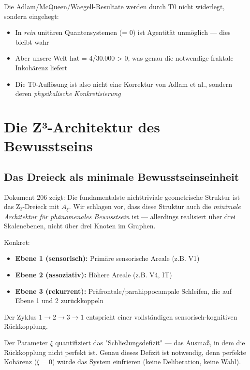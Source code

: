 \documentclass[11pt,a4paper]{article}
\begin{document}
	Die Adlam/McQueen/Waegell-Resultate werden durch T0 nicht widerlegt, sondern eingehegt:
	\begin{itemize}
		\item In \emph{rein} unitären Quantensystemen (\xi = 0) ist Agentität unmöglich — dies bleibt wahr
		\item Aber unsere Welt hat \xi = 4/30.000 > 0, was genau die notwendige fraktale Inkohärenz liefert
		\item Die T0-Auflösung ist also nicht eine Korrektur von Adlam et al., sondern deren \emph{physikalische Konkretisierung}
	\end{itemize}
	
	\section{Die Z³-Architektur des Bewusstseins}
	\label{sec:z3_architektur}
	
	\subsection{Das Dreieck als minimale Bewusstseinseinheit}
	
	Dokument 206 zeigt: Die fundamentalste nichttriviale geometrische Struktur ist das Z₃-Dreieck mit \(A_\xi\). Wir schlagen vor, dass diese Struktur auch die \emph{minimale Architektur für phänomenales Bewusstsein} ist — allerdings realisiert über drei Skalenebenen, nicht über drei Knoten im Graphen.
	
	Konkret:
	
	\begin{predbox}
		\begin{itemize}
			\item \textbf{Ebene 1 (sensorisch):} Primäre sensorische Areale (z.B. V1)
			\item \textbf{Ebene 2 (assoziativ):} Höhere Areale (z.B. V4, IT)
			\item \textbf{Ebene 3 (rekurrent):} Präfrontale/parahippocampale Schleifen, die auf Ebene 1 und 2 zurückkoppeln
		\end{itemize}
		Der Zyklus \(1 \to 2 \to 3 \to 1\) entspricht einer vollständigen sensorisch-kognitiven Rückkopplung.
	\end{predbox}
	
	Der Parameter \(\xi\) quantifiziert das "Schließungsdefizit" — das Ausmaß, in dem die Rückkopplung nicht perfekt ist. Genau dieses Defizit ist notwendig, denn perfekte Kohärenz (\(\xi = 0\)) würde das System einfrieren (keine Deliberation, keine Wahl).
	
\end{document}
